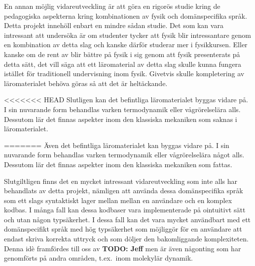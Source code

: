 \begin{draft}
En annan möjlig vidareutveckling är att göra en rigorös studie kring de
pedagogiska aspekterna kring kombinationen av fysik och domänspecifika språk.
Detta projekt innehöll enbart en mindre sådan studie. Det som kan vara
intressant att undersöka är om studenter tycker att fysik blir intressantare
genom en kombination av detta slag och kanske därför studerar mer i fysikkursen.
Eller kanske om de rent av blir bättre på fysik i sig genom att fysik
presenterats på detta sätt, det vill säga att ett läromaterial av detta slag
skulle kunna fungera istället för traditionell undervisning inom fysik. Givetvis
skulle kompletering av läromaterialet behöva göras så att det är heltäckande.

<<<<<<< HEAD
Slutligen kan det befintliga läromaterialet byggas vidare på. I sin nuvarande
form behandlas varken termodynamik eller vågrörelselära alls. Dessutom lär
det finnas aspekter inom den klassiska mekaniken som saknas i läromaterialet.



=======
Även det befintliga läromaterialet kan byggas vidare på. I sin nuvarande
form behandlas varken termodynamik eller vågrörelselära något alls. Dessutom lär
det finnas aspekter inom den klassiska mekaniken som fattas.

\end{draft}
\begin{binge}

Slutgiltligen finns det en mycket intressant vidareutveckling som inte alls har
behandlats av detta projekt, nämligen att använda dessa domänspecifika språk som
ett slags syntaktiskt lager mellan mellan en användare och en komplex kodbas. I
många fall kan dessa kodbaser vara implementerade på ointuitivt sätt och utan
någon typsäkerhet. I dessa fall kan det vara mycket användbart med ett
domänspecifikt språk med hög typsäkerhet som möjliggör för en användare att
endast skriva korrekta uttryck och som döljer den bakomliggande komplexiteten.
Denna idè framfördes till oss av \textbf{TODO: Jeff} men är även någonting som
har genomförts på andra områden, t.ex.~inom molekylär dynamik\cite{MD}.

\end{binge}

